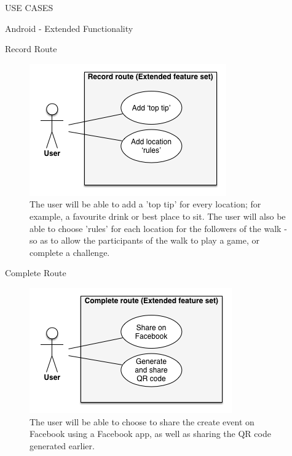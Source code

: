 \documentclass{article}
\begin{document}
\begin{section}{USE CASES}
\begin{subsection}{Android - Extended Functionality}
			\begin{subsubsection}{Record Route}
				\begin{figure}[h!]
					\begin{center}
						\includegraphics[height=0.3\columnwidth]{images/UseCase/Android/Extended/RecordRoute_Extended.png}
					\end{center}
					\caption{The user will be able to add a 'top tip' for every location; for example, a favourite drink or best place to sit. The user will also be able to choose 'rules' for each location for the followers of the walk - so as to allow the participants of the walk to play a game, or complete a challenge.}
				\end{figure}
			\end{subsubsection}
			
			\clearpage
			\begin{subsubsection}{Complete Route}
				\begin{figure}[h!]
					\begin{center}
						\includegraphics[height=0.3\columnwidth]{images/UseCase/Android/Extended/CompleteRoute_Extended.png}
					\end{center}
					\caption{The user will be able to choose to share the create event on Facebook using a Facebook app, as well as sharing the QR code generated earlier.}
				\end{figure}
			\end{subsubsection}
			

\end{subsection}
\end{section}
\end{document}
